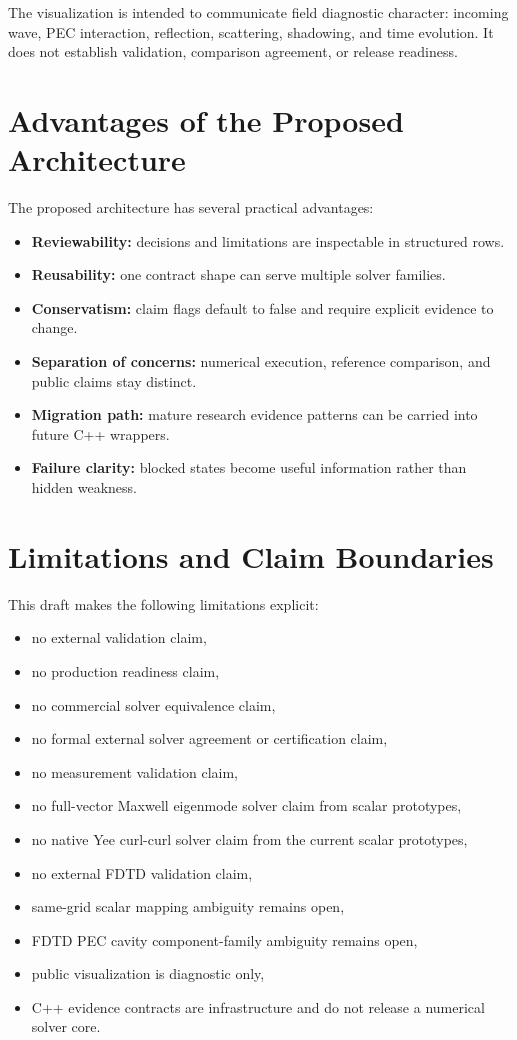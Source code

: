 \documentclass[11pt,a4paper]{article}
\begin{document}
The visualization is intended to communicate field diagnostic character: incoming wave, PEC interaction, reflection, scattering, shadowing, and time evolution. It does not establish validation, comparison agreement, or release readiness.

\section{Advantages of the Proposed Architecture}
\label{sec:advantages}

The proposed architecture has several practical advantages:

\begin{itemize}
  \item \textbf{Reviewability:} decisions and limitations are inspectable in structured rows.
  \item \textbf{Reusability:} one contract shape can serve multiple solver families.
  \item \textbf{Conservatism:} claim flags default to false and require explicit evidence to change.
  \item \textbf{Separation of concerns:} numerical execution, reference comparison, and public claims stay distinct.
  \item \textbf{Migration path:} mature research evidence patterns can be carried into future C++ wrappers.
  \item \textbf{Failure clarity:} blocked states become useful information rather than hidden weakness.
\end{itemize}

\section{Limitations and Claim Boundaries}
\label{sec:limitations}

This draft makes the following limitations explicit:

\begin{itemize}
  \item no external validation claim,
  \item no production readiness claim,
  \item no commercial solver equivalence claim,
  \item no formal external solver agreement or certification claim,
  \item no measurement validation claim,
  \item no full-vector Maxwell eigenmode solver claim from scalar prototypes,
  \item no native Yee curl-curl solver claim from the current scalar prototypes,
  \item no external FDTD validation claim,
  \item same-grid scalar mapping ambiguity remains open,
  \item FDTD PEC cavity component-family ambiguity remains open,
  \item public visualization is diagnostic only,
  \item C++ evidence contracts are infrastructure and do not release a numerical solver core.
\end{itemize}
\end{document}
